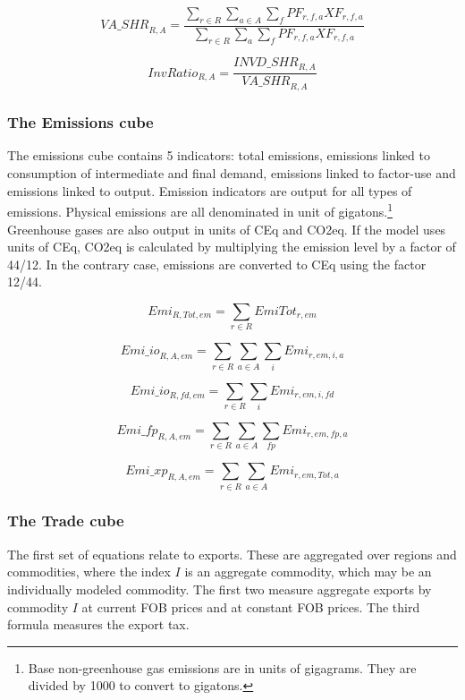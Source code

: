 \[
\mathit{VA\_SHR}_{R,A} = \frac{
\sum_{r \in R} {\sum_{a \in A} {\sum_f{\mathit{PF}_{r,f,a}\mathit{XF}_{r,f,a}}}}}
{
\sum_{r \in R} {\sum_{a} {\sum_f{\mathit{PF}_{r,f,a}\mathit{XF}_{r,f,a}}}}}
\]

\[
\mathit{InvRatio}_{R,A} = \frac{\mathit{INVD\_SHR}_{R,A}}
{\mathit{VA\_SHR}_{R,A}}
\]

\subsubsection{The Emissions cube}

The emissions cube contains 5 indicators:
total emissions, emissions linked to consumption
of intermediate and final demand, emissions
linked to factor-use and emissions linked to
output. Emission indicators are output for all types of emissions. Physical emissions are all
denominated in unit of gigatons.\footnote{Base
non-greenhouse gas emissions are in units
of gigagrams. They are divided by 1000 to
convert to gigatons.}
Greenhouse gases are also output in units
of CEq and CO2eq. If the model uses units
of CEq, CO2eq is calculated by multiplying
the emission level by a factor of 44/12. In
the contrary case, emissions are converted to
CEq using the factor 12/44.


\[
\mathit{Emi}_{R,\mathit{Tot},\mathit{em}}
= \sum_{r \in R} {\mathit{EmiTot}_{r,\mathit{em}}}
\]

\[
\mathit{Emi\_io}_{R,\mathit{A},\mathit{em}}
= \sum_{r \in R} {\sum_{a \in A} {\sum_i {\mathit{Emi}_{r,\mathit{em},i,a}}}}
\]

\[
\mathit{Emi\_io}_{R,\mathit{fd},\mathit{em}}
= \sum_{r \in R} { {\sum_i {\mathit{Emi}_{r,\mathit{em},i,\mathit{fd}}}}}
\]

\[
\mathit{Emi\_fp}_{R,\mathit{A},\mathit{em}}
= \sum_{r \in R} {\sum_{a \in A} {\sum_{\mathit{fp}} {\mathit{Emi}_{r,\mathit{em},\mathit{fp},a}}}}
\]

\[
\mathit{Emi\_xp}_{R,\mathit{A},\mathit{em}}
= \sum_{r \in R} {\sum_{a \in A}  {\mathit{Emi}_{r,\mathit{em},\mathit{Tot},a}}}
\]

\subsubsection{The Trade cube}

The first set of equations relate to exports.
These are aggregated over regions and commodities,
where the index $I$ is an aggregate commodity,
which may be an individually modeled commodity.
The first two measure aggregate exports
by commodity $I$ at current FOB prices and
at constant FOB prices. The third formula
measures the export tax.

